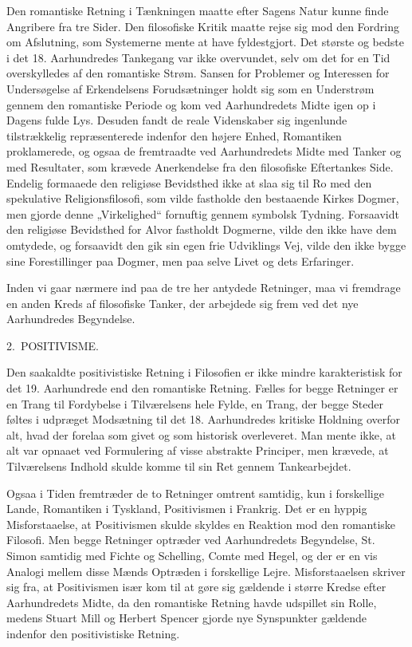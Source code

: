 \documentclass[12pt,a4paper,openany]{book}
\newcommand{\opage}[1]{\marginnote{\footnotesize\textit{[#1]}}}
\newcommand{\chapterhead}[2]{\par\bigskip\phantomsection\begin{center}{\large #1\ #2}\end{center}\addcontentsline{toc}{chapter}{#1 #2}\medskip}
\begin{document}
Den romantiske Retning i Tænkningen maatte efter Sagens Natur
kunne finde Angribere fra tre Sider. Den filosofiske Kritik maatte
rejse sig mod den Fordring om Afslutning, som Systemerne mente at
have fyldestgjort. Det største og bedste i det 18. Aarhundredes Tankegang
var ikke overvundet, selv om det for en Tid overskylledes af
den romantiske Strøm. Sansen for Problemer og Interessen for Undersøgelse
af Erkendelsens Forudsætninger holdt sig som en Understrøm
gennem den romantiske Periode og kom ved Aarhundredets
Midte igen op i Dagens fulde Lys. Desuden fandt de reale Videnskaber
sig ingenlunde tilstrækkelig repræsenterede indenfor den højere
Enhed, Romantiken proklamerede, og ogsaa de fremtraadte ved Aarhundredets
Midte med Tanker og med Resultater, som krævede Anerkendelse
fra den filosofiske Eftertankes Side. Endelig formaaede den
religiøse Bevidsthed ikke at slaa sig til Ro med den spekulative Religionsfilosofi,
som vilde fastholde den bestaaende Kirkes Dogmer,
men gjorde denne „Virkelighed“ fornuftig gennem symbolsk Tydning.
Forsaavidt den religiøse Bevidsthed for Alvor fastholdt Dogmerne,
vilde den ikke have dem omtydede, og forsaavidt den gik sin
egen frie Udviklings Vej, vilde den ikke bygge sine Forestillinger paa
Dogmer, men paa selve Livet og dets Erfaringer.

Inden vi gaar nærmere ind paa de tre her antydede Retninger,
maa vi fremdrage en anden Kreds af filosofiske Tanker, der arbejdede
sig frem ved det nye Aarhundredes Begyndelse.

\chapterhead{2.}{POSITIVISME.}

Den saakaldte positivistiske Retning i Filosofien er ikke mindre
karakteristisk for det 19. Aarhundrede end den romantiske Retning.
Fælles for begge Retninger er en Trang til Fordybelse i Tilværelsens
hele Fylde, en Trang, der begge Steder føltes i udpræget Modsætning
\opage{15}til det 18. Aarhundredes kritiske Holdning overfor alt, hvad der forelaa
som givet og som historisk overleveret. Man mente ikke, at alt
var opnaaet ved Formulering af visse abstrakte Principer, men krævede,
at Tilværelsens Indhold skulde komme til sin Ret gennem Tankearbejdet.


Ogsaa i Tiden fremtræder de to Retninger omtrent samtidig, kun
i forskellige Lande, Romantiken i Tyskland, Positivismen i Frankrig.
Det er en hyppig Misforstaaelse, at Positivismen skulde skyldes
en Reaktion mod den romantiske Filosofi. Men begge Retninger optræder
ved Aarhundredets Begyndelse, St. Simon samtidig med
Fichte og Schelling, Comte med Hegel, og der er en vis Analogi mellem
disse Mænds Optræden i forskellige Lejre. Misforstaaelsen skriver
sig fra, at Positivismen især kom til at gøre sig gældende i større
Kredse efter Aarhundredets Midte, da den romantiske Retning havde
udspillet sin Rolle, medens Stuart Mill og Herbert Spencer gjorde
nye Synspunkter gældende indenfor den positivistiske Retning.
\end{document}
